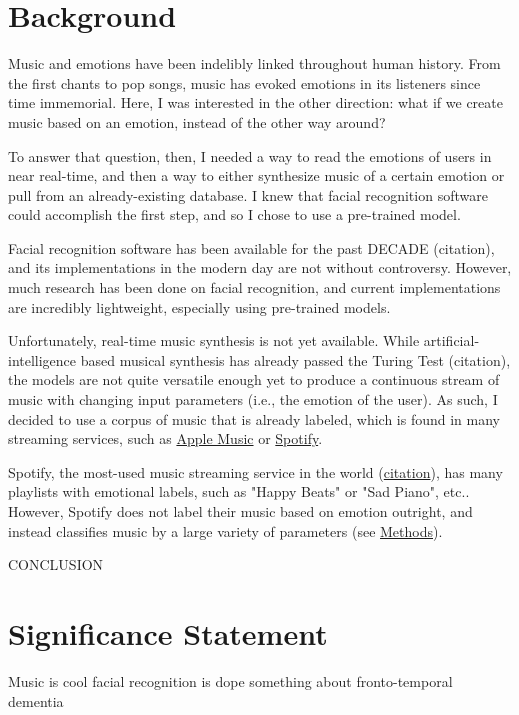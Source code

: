 \documentclass{article}
\renewcommand{\_}[1]{\underline{ #1 }}
\theoremstyle{definition}
\begin{document}
\section{Background}

Music and emotions have been indelibly linked throughout human history. From the first chants to pop songs, music has evoked emotions in its listeners since time immemorial. Here, I was interested in the other direction: what if we create music based on an emotion, instead of the other way around?

To answer that question, then, I needed a way to read the emotions of users in near real-time, and then a way to either synthesize music of a certain emotion or pull from an already-existing database. I knew that facial recognition software could accomplish the first step, and so I chose to use a pre-trained model.

Facial recognition software has been available for the past DECADE (citation), and its implementations in the modern day are not without controversy. However, much research has been done on facial recognition, and current implementations are incredibly lightweight, especially using pre-trained models. 

Unfortunately, real-time music synthesis is not yet available. While artificial-intelligence based musical synthesis has already passed the Turing Test (citation), the models are not quite versatile enough yet to produce a continuous stream of music with changing input parameters (i.e., the emotion of the user). As such, I decided to use a corpus of music that is already labeled, which is found in many streaming services, such as \href{https://www.apple.com/apple-music/}{Apple Music} or \href{https://www.spotify.com/us/}{Spotify}.

Spotify, the most-used music streaming service in the world (\href{https://www.midiaresearch.com/blog/music-subscriber-market-shares-q2-2021}{citation}), has many playlists with emotional labels, such as "Happy Beats" or "Sad Piano", etc.. However, Spotify does not label their music based on emotion outright, and instead classifies music by a large variety of parameters (see \hyperref[sec:methods]{Methods}). 

CONCLUSION

\section[sec:sig_stat]{Significance Statement}

Music is cool facial recognition is dope something about fronto-temporal dementia
\end{document}
